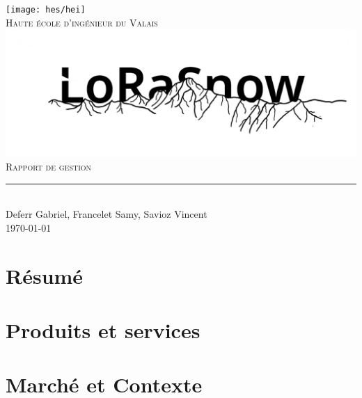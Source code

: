 \documentclass[11pt,titlepage]{report}
\begin{document}
\begin{titlepage}
	\centering
    \texttt{[image: hes/hei]}\\[0.5cm] 	%
    \textsc{\Large Haute école d'ingénieur du Valais}\\ \vspace{\fill}
	\includegraphics[width=1\linewidth]{Images/lorasnow/logo.png}\\ \vspace{\fill}
	\textsc{\LARGE Rapport de gestion}\\[0.4cm]
	\rule{\linewidth}{0.2 mm} \\[0.5 cm]
	Deferr Gabriel, Francelet Samy, Savioz Vincent \\
	\today
\end{titlepage}
\restoregeometry

\tableofcontents

\pagestyle{fancy}


\chapter{Résumé}


\chapter{Produits et services}


\chapter{Marché et Contexte}

\end{document}

